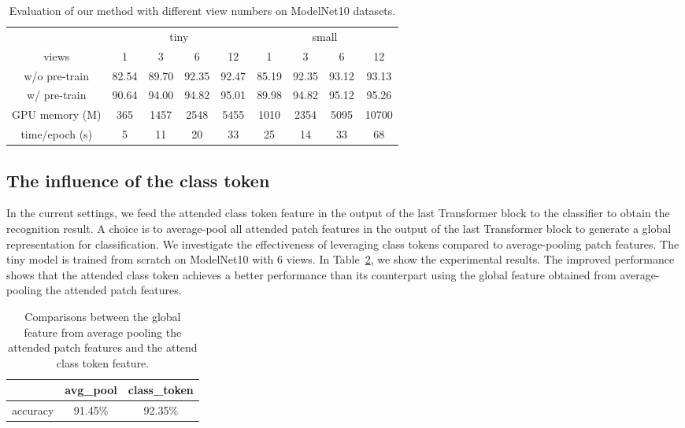 \documentclass{bmvc2k}
\begin{document}
\begin{table}[t]
\centering
\begin{tabular}{ccccccccc}
\toprule
& \multicolumn{4}{c}{tiny} & \multicolumn{4}{c}{small}\\
\cmidrule(lr){2-5} \cmidrule(lr){6-9}
views & 1 & 3 & 6 & 12 & 1 & 3 & 6 & 12\\
\midrule
w/o pre-train & 82.54 & 89.70 & 92.35 & 92.47 & 85.19 & 92.35 & 93.12 & 93.13 \\
w/ pre-train & 90.64 & 94.00 & 94.82 & 95.01 & 89.98 & 94.82 & 95.12 & 95.26  \\
\midrule
GPU memory (M) & 365 & 1457 & 2548 & 5455 & 1010 & 2354 & 5095 & 10700 \\
time/epoch (s) & 5 & 11 & 20 & 33 & 25 & 14 & 33 & 68 \\
\bottomrule
\end{tabular}

\vspace{0.05in}

\caption{Evaluation of our method with different view numbers on ModelNet10 datasets. }
\label{tab:M10view}
\end{table}

\subsection{The influence of the class token}
In the current settings, we feed the attended class token feature in the output of the last Transformer block to the classifier to obtain the recognition result. A choice is to average-pool all attended patch features in the output of the last Transformer block to generate a global representation for classification. We investigate the effectiveness of leveraging class tokens compared to average-pooling patch features. The tiny model is trained from scratch on ModelNet10 with 6 views. In Table~\ref{class_token}, we show the experimental results. The improved performance shows that the attended class token achieves a better performance than its counterpart using the global feature obtained from average-pooling the attended patch features.

\begin{table}[htp!]
\centering
\begin{tabular}{ccc}
\toprule
 & avg\_pool & class\_token \\
\midrule
accuracy & 91.45\% & 92.35\% \\
\bottomrule
\end{tabular}

\vspace{0.1in}

\caption{Comparisons between the global feature from average pooling the attended patch features and  the attend class token feature.}
\label{class_token}
\end{table}
\end{document}
